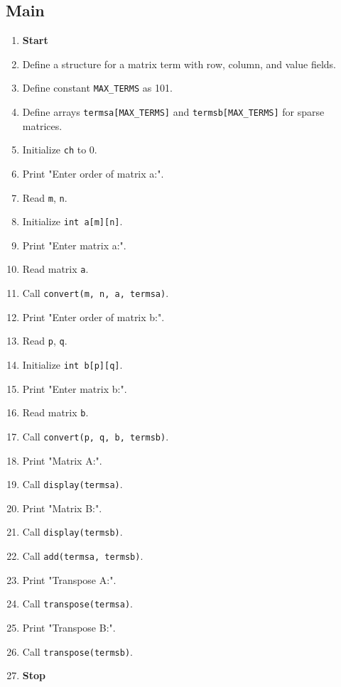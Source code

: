 {  \subsection{Main}

  \begin{enumerate}[label=\arabic*.,left=0pt]
    \item \textbf{Start}
    \item Define a structure for a matrix term with row, column, and value fields.
    \item Define constant \texttt{MAX\_TERMS} as 101.\
    \item Define arrays \texttt{termsa[MAX\_TERMS]} and \texttt{termsb[MAX\_TERMS]} for sparse matrices.
    \item Initialize \texttt{ch} to 0.
    \item Print "Enter order of matrix a:".
    \item Read \texttt{m}, \texttt{n}.
    \item Initialize \texttt{int a[m][n]}.
    \item Print "Enter matrix a:".
    \item Read matrix \texttt{a}.
    \item Call \texttt{convert(m, n, a, termsa)}.
    \item Print "Enter order of matrix b:".
    \item Read \texttt{p}, \texttt{q}.
    \item Initialize \texttt{int b[p][q]}.
    \item Print "Enter matrix b:".
    \item Read matrix \texttt{b}.
    \item Call \texttt{convert(p, q, b, termsb)}.
    \item Print "Matrix A:".
    \item Call \texttt{display(termsa)}.
    \item Print "Matrix B:".
    \item Call \texttt{display(termsb)}.
    \item Call \texttt{add(termsa, termsb)}.
    \item Print "Transpose A:".
    \item Call \texttt{transpose(termsa)}.
    \item Print "Transpose B:".
    \item Call \texttt{transpose(termsb)}.
    \item \textbf{Stop}
  \end{enumerate}
 }

